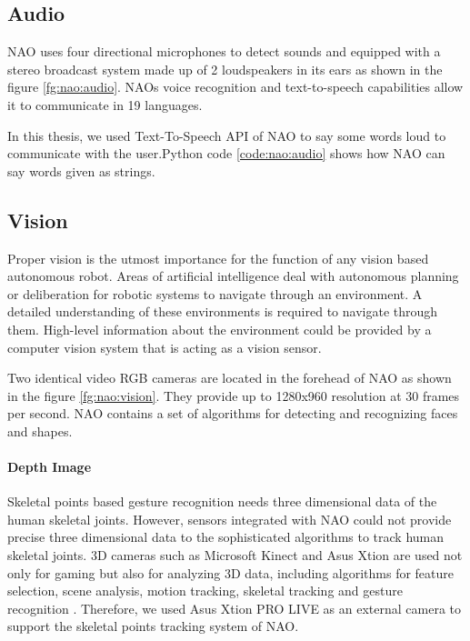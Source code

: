  \label{code:nao:motion}

\subsection{Audio} NAO uses four directional microphones to detect sounds and equipped with a stereo broadcast system made up of 2 loudspeakers in its ears as shown in the figure \ref{fg:nao:audio}. NAOs voice recognition and text-to-speech capabilities allow it to communicate in 19 languages. 

 

In this thesis, we used Text-To-Speech API of NAO to say some words loud to communicate with the user.Python code \ref{code:nao:audio} shows how NAO can say words given as strings.

 \label{code:nao:audio}



\subsection{Vision} \label{sec:nao:vision}
Proper vision is the utmost importance for the function of any vision based autonomous robot. Areas of artificial intelligence deal with autonomous planning or deliberation for robotic systems to navigate through an environment. A detailed understanding of these environments is required to navigate through them. High-level information about the environment could be provided by a computer vision system that is acting as a vision sensor.

 Two identical video RGB cameras are located in the forehead of NAO as shown in the figure \ref{fg:nao:vision}. They provide up to 1280x960 resolution at 30 frames per second. NAO contains a set of algorithms for detecting and recognizing faces and shapes.

\paragraph*{Depth Image} Skeletal points based gesture recognition needs three dimensional data of the human skeletal joints. However, sensors integrated with NAO could not provide precise three dimensional data to the sophisticated algorithms to track human skeletal joints. 3D cameras such as Microsoft Kinect and Asus Xtion are used not only for gaming but also for analyzing 3D data, including algorithms for feature selection, scene analysis, motion tracking, skeletal tracking and gesture recognition \cite{12}. Therefore, we used Asus Xtion PRO LIVE as an external camera to support the skeletal points tracking system of NAO. 

